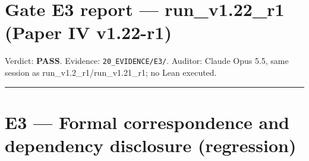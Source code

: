 \documentclass[
]{article}
\author{}
\date{}
\begin{document}
\section{Gate E3 report --- run\_v1.22\_r1 (Paper IV
v1.22-r1)}\label{gate-e3-report--run_v122_r1-paper-iv-v122-r1}

Verdict: \textbf{PASS}. Evidence: \texttt{20\_EVIDENCE/E3/}. Auditor:
Claude Opus 5.5, same session as run\_v1.2\_r1/run\_v1.21\_r1; no Lean
executed.

\begin{center}\rule{0.5\linewidth}{0.5pt}\end{center}

\section{E3 --- Formal correspondence and dependency disclosure
(regression)}\label{e3--formal-correspondence-and-dependency-disclosure-regression}
\end{document}
